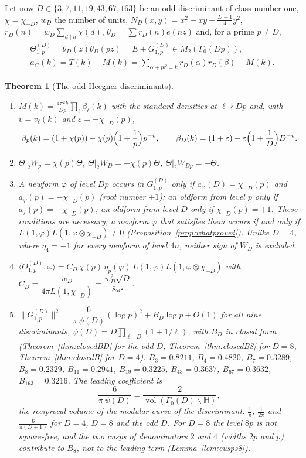 \documentclass[11pt]{amsart}
\newtheorem{theorem}{Theorem}[section]
\theoremstyle{remark}
\newcommand{\HH}{\mathbb{H}}
\newcommand{\e}{\varepsilon}
\DeclareMathOperator{\vol}{vol}
\begin{document}
Let now $D\in\{3,7,11,19,43,67,163\}$ be an odd discriminant of class number one, $\chi=\chi_{-D}$, $w_D$ the number of units, $N_D(x,y)=x^2+xy+\frac{D+1}4y^2$, $r_D(n)=w_D\sum_{d\mid n}\chi(d)$, $\theta_D=\sum r_D(n)e(nz)$ and, for a prime $p\ne D$,
\begin{gather*}
\Theta^{(D)}_{1,p}=\theta_D(z)\theta_D(pz)=E+G^{(D)}_{1,p}\in M_2(\Gamma_0(Dp)),\\
a_G(k)=T(k)-M(k)=\sum_{\alpha+p\beta=k}r_D(\alpha)r_D(\beta)-M(k).
\end{gather*}

\begin{theorem}[The odd Heegner discriminants]\label{thm:B}
\begin{enumerate}[label=\textup{(\roman*)},leftmargin=2.2em]
\item $M(k)=\frac{4\pi^2k}{Dp}\prod_\ell\beta_\ell(k)$ with the standard densities at $\ell\nmid Dp$ and, with $v=v_\ell(k)$ and $\e=-\chi_{-D}(p)$,
\[
\beta_p(k)=(1+\chi(p))-\chi(p)\Bigl(1+\frac1p\Bigr)p^{-v},\qquad \beta_D(k)=(1+\e)-\e\Bigl(1+\frac1D\Bigr)D^{-v}.
\]
\item $\Theta|_2W_p=\chi(p)\Theta$, $\Theta|_2W_D=-\chi(p)\Theta$, $\Theta|_2W_{Dp}=-\Theta$.
\item A newform $\varphi$ of level $Dp$ occurs in $G^{(D)}_{1,p}$ only if $a_\varphi(D)=\chi_{-D}(p)$ and $a_\varphi(p)=-\chi_{-D}(p)$ (root number $+1$); an oldform from level $p$ only if $a_f(p)=-\chi_{-D}(p)$; an oldform from level $D$ only if $\chi_{-D}(p)=+1$. These conditions are necessary; a newform $\varphi$ that satisfies them occurs if and only if $L(1,\varphi)L(1,\varphi\otimes\chi_{-D})\ne0$ (Proposition~\ref{prop:whatproved}). Unlike $D=4$, where $\eta_4=-1$ for every newform of level $4n$, neither sign of $W_D$ is excluded.
\item $\langle\Theta^{(D)}_{1,p},\varphi\rangle=C_D\,\chi(p)\,\eta_p(\varphi)\,L(1,\varphi)L(1,\varphi\otimes\chi_{-D})$ with $C_D=\dfrac{w_D}{4\pi L(1,\chi_{-D})}=\dfrac{w_D^2\sqrt D}{8\pi^2}$.
\item $\|G^{(D)}_{1,p}\|^2=\dfrac{6}{\pi\,\psi(D)}(\log p)^2+B_D\log p+O(1)$ for all nine discriminants, $\psi(D)=D\prod_{\ell\mid D}(1+1/\ell)$, with $B_D$ in closed form (Theorem~\ref{thm:closedBD} for the odd $D$, Theorem~\ref{thm:closedB8} for $D=8$, Theorem~\ref{thm:closedB} for $D=4$): $B_3=0.8211$, $B_4=0.4820$, $B_7=0.3289$, $B_8=0.2329$, $B_{11}=0.2941$, $B_{19}=0.3225$, $B_{43}=0.3637$, $B_{67}=0.3632$, $B_{163}=0.3216$. The leading coefficient is
\[
\frac{6}{\pi\,\psi(D)}=\frac{2}{\vol(\Gamma_0(D)\backslash\HH)},
\]
the reciprocal volume of the modular curve of the discriminant: $\frac1\pi$, $\frac1{2\pi}$ and $\frac6{\pi(D+1)}$ for $D=4$, $D=8$ and the odd $D$. For $D=8$ the level $8p$ is not square-free, and the two cusps of denominators $2$ and $4$ (widths $2p$ and $p$) contribute to $B_8$, not to the leading term (Lemma~\ref{lem:cusps8}).
\end{enumerate}
\end{theorem}
\end{document}
